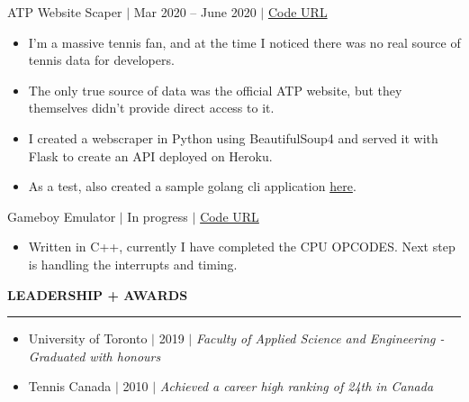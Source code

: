 \documentclass[12pt]{article}
\newcommand{\sectionRule}{\textcolor{gray}{\rule{7.27in}{0.02cm}}}
\newcommand{\sectionTxt}[1]{\noindent\textbf{#1}\\}
\newcommand{\textDate}[3]{\noindent#1 $|$ #2 $|$ {\color{textGray} #3}}
\begin{document}
    \textDate{ATP Website Scaper}{Mar 2020 -- June 2020}{\href{https://github.com/Sammyalhashe/ATPScraper}{Code URL}}
    \begin{small}
        \begin{itemize}
            \itemsep0em 
            \item {\color{textGray} I'm a massive tennis fan, and at the time I noticed there was no real source of tennis data for developers.}
            \item {\color{textGray} The only true source of data was the official ATP website, but they themselves didn't provide direct access to it.}
            \item {\color{textGray} I created a webscraper in Python using BeautifulSoup4 and served it with Flask to create an API deployed on Heroku.}
            \item {\color{textGray} As a test, also created a sample golang cli application \href{https://github.com/Sammyalhashe/atp-commandline}{here}.}
        \end{itemize}
    \end{small}

    \textDate{Gameboy Emulator}{In progress}{\href{https://github.com/Sammyalhashe/GameboyEmulator}{Code URL}}
    \begin{small}
        \begin{itemize}
            \itemsep0em 
            \item {\color{textGray} Written in C++, currently I have completed the CPU OPCODES. Next step is handling the interrupts and timing.}
        \end{itemize}
    \end{small}

    \sectionTxt{LEADERSHIP + AWARDS}
    \sectionRule

    \begin{small}
        \begin{itemize}
            \itemsep0em
            \item {\color{textGray} \textDate{University of Toronto}{2019}{\textit{Faculty of Applied Science and Engineering - Graduated with honours}}}
            \item {\color{textGray} \textDate{Tennis Canada}{2010}{\textit{Achieved a career high ranking of 24th in Canada}}}
        \end{itemize}
    \end{small}
\end{document}
